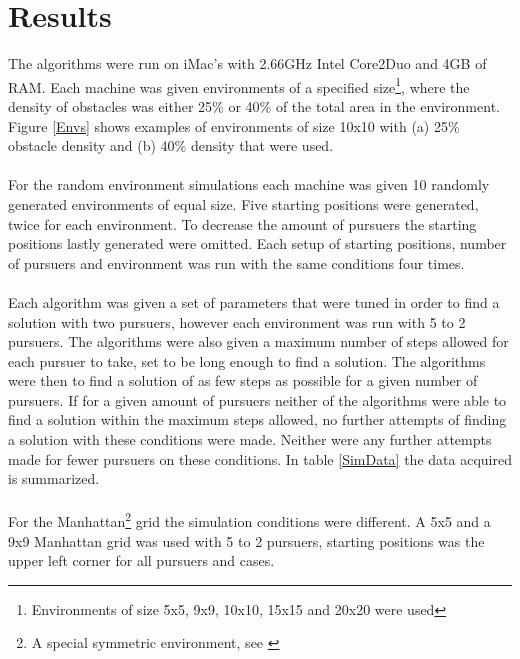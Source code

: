 \chapter{Results}
The algorithms were run on iMac's with 2.66GHz Intel Core2Duo and 4GB of RAM. Each machine was given environments of a specified size\footnote{Environments of size 5x5, 9x9, 10x10, 15x15 and 20x20 were used}, where the density of obstacles was either 25\% or 40\% of the total area in the environment. Figure \ref{Envs} shows examples of environments of size 10x10 with (a) 25\% obstacle density and (b) 40\% density that were used.\\
\\For the random environment simulations each machine was given 10 randomly generated environments of equal size. Five starting positions were generated, twice for each environment. To decrease the amount of pursuers the starting positions lastly generated were omitted. Each setup of starting positions, number of pursuers and environment was run with the same conditions four times. \\
\\Each algorithm was given a set of parameters that were tuned in order to find a solution with two pursuers, however each environment was run with 5 to 2 pursuers. The algorithms were also given a maximum number of steps allowed for each pursuer to take, set to be long enough to find a solution. The algorithms were then to find a solution of as few steps as possible for a given number of pursuers. If for a given amount of pursuers neither of the algorithms were able to find a solution within the maximum steps allowed, no further attempts of finding a solution with these conditions were made. Neither were any further attempts made for fewer pursuers on these conditions. In table \ref{SimData} the data acquired is summarized.\\
\\For the Manhattan\footnote{A special symmetric environment, see \cite{paper1}} grid the simulation conditions were different. A 5x5 and a 9x9 Manhattan grid was used with 5 to 2 pursuers, starting positions was the upper left corner for all pursuers and cases.\\
